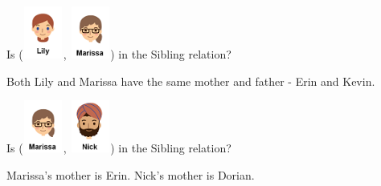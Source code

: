 \documentclass{ximera}
\begin{document}
\begin{exercise}
Is ({\includegraphics[width=50px,height=65px]{pics/people/lily.png}}, {\includegraphics[width=50px,height=65px]{pics/people/marissa.png}}) in the Sibling relation?

  \begin{multipleChoice}
  \end{multipleChoice}
  \begin{feedback}
Both Lily and Marissa have the same mother and father - Erin and Kevin.
  \end{feedback}
\end{exercise}












\begin{exercise}
Is ({\includegraphics[width=50px,height=65px]{pics/people/marissa.png}}, {\includegraphics[width=50px,height=65px]{pics/people/nick.png}}) in the Sibling relation?

  \begin{multipleChoice}
  \end{multipleChoice}
  \begin{feedback}
Marissa's mother is Erin. Nick's mother is Dorian.
  \end{feedback}
\end{exercise}
\end{document}
